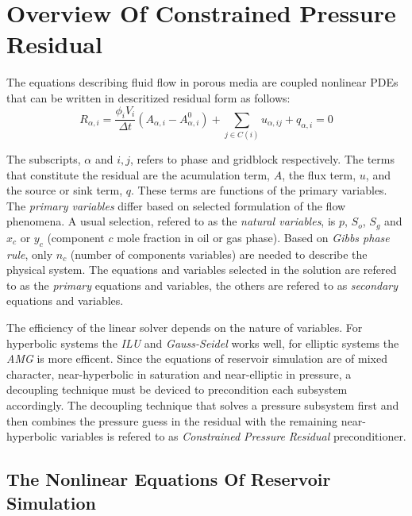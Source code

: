 \chapter{Overview Of Constrained Pressure Residual}

The equations describing fluid flow in porous media are coupled nonlinear PDEs that can be written in descritized
residual form as follows\supercite{opmflow}:
\begin{equation}
	R_{\alpha,i} = \frac{\phi_{i}V_{i}}{\Delta t} (A_{\alpha,i} - A^{0}_{\alpha,i}) + \sum_{j\in C(i)} u_{\alpha,ij} + q_{\alpha,i} = 0
	\label{res_bal}
\end{equation}

The subscripts, $\alpha$ and $i, j$, refers to phase and gridblock respectively. The terms that 
constitute the residual are the acumulation term, $A$, the flux term, $u$, and the source or sink term,
$q$. These terms are functions of the primary variables. The \textit{primary variables} differ based on 
selected formulation of the flow phenomena. A usual selection, refered to as the \textit{natural variables}, is
$p$, $S_{o}$, $S_{g}$ and $x_{c}$ or $y_{c}$ (component $c$ mole fraction in oil or gas phase). Based on \textit{Gibbs phase rule}, 
only $n_{c}$ (number of components variables) are needed to describe the physical system\supercite{cao}. The equations and variables selected
in the solution are refered to as the \textit{primary} equations and variables, the others are refered to as \textit{secondary} equations and variables. 

The efficiency of the linear solver depends on the nature of variables. For hyperbolic systems the \textit{ILU} and \textit{Gauss-Seidel} works well, for
elliptic systems the \textit{AMG} is more efficent. Since the equations of reservoir simulation are of mixed character, near-hyperbolic in saturation and
near-elliptic in pressure, a decoupling technique must be deviced to precondition each subsystem accordingly. The decoupling technique that solves a pressure
subsystem first and then combines the pressure guess in the residual with the remaining near-hyperbolic variables is refered to as \textit{Constrained Pressure Residual} preconditioner.

\section{The Nonlinear Equations Of Reservoir Simulation}

